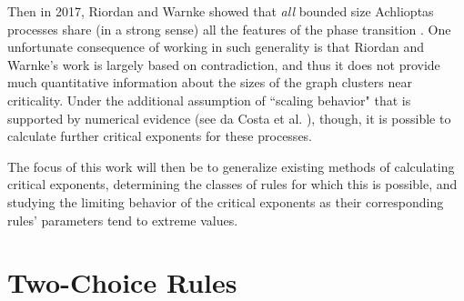 \documentclass[twoside,10pt]{article}
\begin{document}
Then in 2017, Riordan and Warnke showed that \emph{all} bounded size Achlioptas processes share (in a strong sense) all the features of the \ER phase transition \cite{RW-bounded}. One unfortunate consequence of working in such generality is that Riordan and Warnke's work is largely based on contradiction, and thus it does not provide much quantitative information about the sizes of the graph clusters near criticality. Under the additional assumption of ``scaling behavior" that is supported by numerical evidence (see da Costa et al. \cite{daCosta}), though, it is possible to calculate further critical exponents for these processes.

The focus of this work will then be to generalize existing methods of calculating critical exponents, determining the classes of rules for which this is possible, and studying the limiting behavior of the critical exponents as their corresponding rules' parameters tend to extreme values.

\section{Two-Choice Rules}
\end{document}
